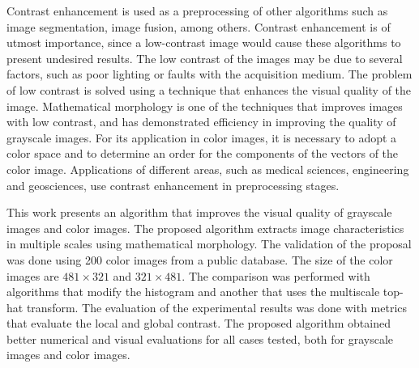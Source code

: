 
\begin{foreignabstract}

Contrast enhancement is used as a preprocessing of other algorithms such as image segmentation, image fusion, among others. Contrast enhancement is of utmost importance, since a low-contrast image would cause these algorithms to present undesired results. The low contrast of the images may be due to several factors, such as poor lighting or faults with the acquisition medium. The problem of low contrast is solved using a technique that enhances the visual quality of the image. Mathematical morphology is one of the techniques that improves images with low contrast, and has demonstrated efficiency in improving the quality of grayscale images. For its application in color images, it is necessary to adopt a color space and to determine an order for the components of the vectors of the color image. Applications of different areas, such as medical sciences, engineering and geosciences, use contrast enhancement in preprocessing stages.

This work presents an algorithm that improves the visual quality of grayscale images and color images. The proposed algorithm extracts image characteristics in multiple scales using mathematical morphology. The validation of the proposal was done using 200 color images from a public database. The size of the color images are $481 \times 321$ and $321 \times 481$. The comparison was performed with algorithms that modify the histogram and another that uses the multiscale top-hat transform. The evaluation of the experimental results was done with metrics that evaluate the local and global contrast. The proposed algorithm obtained better numerical and visual evaluations for all cases tested, both for grayscale images and color images.


\end{foreignabstract}

